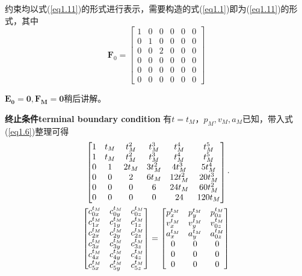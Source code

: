 \documentclass[40pt,a4paper,UTF8,twocolumn]{ctexart}%
\numberwithin{equation}{section}
\begin{document}
约束均以式(\ref{eq1.11})的形式进行表示，需要构造的式(\ref{eq1.1})即为(\ref{eq1.11})的形式，其中
\begin{equation}
    \bm{F}_0=
    \begin{bmatrix}
        1&0&0&0&0&0 \\
        0&1&0&0&0&0 \\
        0&0&2&0&0&0 \\
        0&0&0&0&0&0 \\
        0&0&0&0&0&0 \\
        0&0&0&0&0&0
    \end{bmatrix}
\end{equation}

$\bm{E_0}=\bm{0},\bm{F_{M}}=\bm{0}$稍后讲解。

\textbf{终止条件terminal boundary condition}
有$t=t_M$，$p_M,v_M,a_M$已知，带入式(\ref{eq1.6})整理可得
\begin{align}
    \begin{bmatrix}
        1&t_M&t_M^2&t_M^3&t_M^4&t_M^5 \\
        1&t_M&t_M^2&t_M^3&t_M^4&t_M^5 \\
        0&1&2t_M&3t_M^2&4t_M^3&5t_M^4 \\
        0&0&2&6t_M&12t_M^2&20t_M^3 \\
        0&0&0&6&24t_M&60t_M^2 \\
        0&0&0&0&24&120t_M
    \end{bmatrix} \cdot \notag \\
    \begin{bmatrix}
        c_{0x}^{t_M}&c_{0y}^{t_M}&c_{0z}^{t_M} \\
        c_{1x}^{t_M}&c_{1y}^{t_M}&c_{1z}^{t_M} \\
        c_{2x}^{t_M}&c_{2y}^{t_M}&c_{2z}^{t_M} \\
        c_{3x}^{t_M}&c_{3y}^{t_M}&c_{3z}^{t_M} \\
        c_{4x}^{t_M}&c_{4y}^{t_M}&c_{4z}^{t_M} \\
        c_{5x}^{t_M}&c_{5y}^{t_M}&c_{5z}^{t_M} 
    \end{bmatrix}
    = 
    \begin{bmatrix}
        p_{x}^{t_M} &p_{y}^{t_M} &p_{0z}^{t_M}\\ 
        v_{x}^{t_M} &v_{y}^{t_M} &v_{0z}^{t_M}\\ 
        a_{x}^{t_M} &a_{y}^{t_M} &a_{0z}^{t_M}\\ 
        0&0&0 \\
        0&0&0 \\
        0&0&0
    \end{bmatrix}
\end{align}
\end{document}
